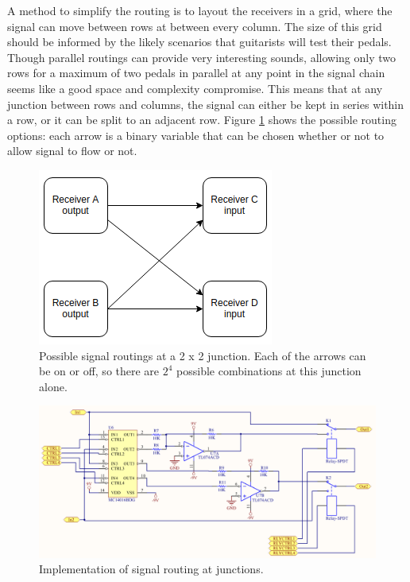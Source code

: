 \documentclass{article}
\begin{document}
		A method to simplify the routing is to layout the receivers in a grid, where the signal can move between rows at between every column.  The size of this grid should be informed by the likely scenarios that guitarists will test their pedals.  Though parallel routings can provide very interesting sounds, allowing only two rows for a maximum of two pedals in parallel at any point in the signal chain seems like a good space and complexity compromise.  This means that at any junction between rows and columns, the signal can either be kept in series within a row, or it can be split to an adjacent row.  Figure \ref{fig:JunctionRouting} shows the possible routing options: each arrow is a binary variable that can be chosen whether or not to allow signal to flow or not.

		\begin{figure}
			\centering
			\includegraphics[width = 0.4 \textwidth]{PR2Images/JunctionRouting}
			\caption{Possible signal routings at a 2 x 2 junction.  Each of the arrows can be on or off, so there are $2^4$ possible combinations at this junction alone.}
			\label{fig:JunctionRouting}
		\end{figure}

		\begin{figure}
			\centering
			\includegraphics[width = \textwidth]{PR2Images/SignalJunctionSchematic.PNG}
			\caption{Implementation of signal routing at junctions.}
			\label{fig:JunctionSchematic}
		\end{figure}
\end{document}
